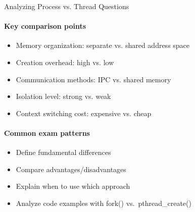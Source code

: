 \begin{KR}{Analyzing Process vs. Thread Questions}
    \paragraph{Key comparison points}
    \begin{itemize}
        \item Memory organization: separate vs. shared address space
        \item Creation overhead: high vs. low
        \item Communication methods: IPC vs. shared memory
        \item Isolation level: strong vs. weak
        \item Context switching cost: expensive vs. cheap
    \end{itemize}
    
    \paragraph{Common exam patterns}
    \begin{itemize}
        \item Define fundamental differences
        \item Compare advantages/disadvantages
        \item Explain when to use which approach
        \item Analyze code examples with fork() vs.\ pthread\_create()
    \end{itemize}
\end{KR}



